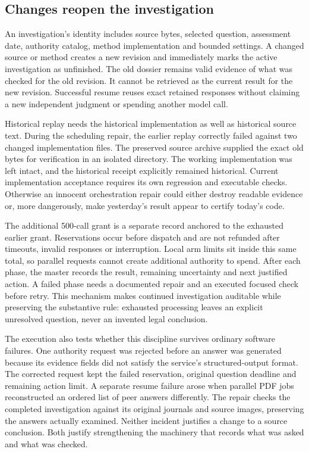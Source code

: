 \documentclass[12pt,a4paper,oneside,openany]{book}
\begin{document}
\subsection{Changes reopen the investigation}

An investigation's identity includes source bytes, selected question, assessment
date, authority catalog, method implementation and bounded settings. A changed
source or method creates a new revision and immediately marks the active
investigation as unfinished. The old dossier remains valid evidence of what was
checked for the old revision. It cannot be retrieved as the current result for
the new revision. Successful resume reuses exact retained responses without
claiming a new independent judgment or spending another model call.

Historical replay needs the historical implementation as well as historical
source text. During the scheduling repair, the earlier replay correctly failed
against two changed implementation files. The preserved source archive supplied
the exact old bytes for verification in an isolated directory. The working
implementation was left intact, and the historical receipt explicitly remained
historical. Current implementation acceptance requires its own regression and
executable checks. Otherwise an innocent orchestration repair could either
destroy readable evidence or, more dangerously, make yesterday's result appear
to certify today's code.

The additional 500-call grant is a separate record anchored to the exhausted
earlier grant. Reservations occur before dispatch and are not refunded after
timeouts, invalid responses or interruption. Local arm limits sit inside this
same total, so parallel requests cannot create additional authority to spend.
After each phase, the master records the result, remaining uncertainty and next
justified action. A failed phase needs a documented repair and an executed
focused check before retry. This mechanism makes continued investigation
auditable while preserving the substantive rule: exhausted processing leaves
an explicit unresolved question, never an invented legal conclusion.

The execution also tests whether this discipline survives ordinary software
failures. One authority request was rejected before an answer was generated
because its evidence fields did not satisfy the service's structured-output
format. The corrected request kept the failed reservation, original question
deadline and remaining action limit. A separate resume failure arose when
parallel PDF jobs reconstructed an ordered list of peer answers differently.
The repair checks the completed investigation against its original journals
and source images, preserving the answers actually examined. Neither incident
justifies a change to a source conclusion. Both justify strengthening the
machinery that records what was asked and what was checked.
\end{document}
